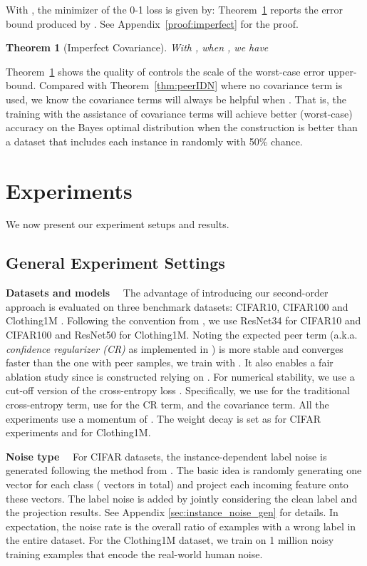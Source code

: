 \documentclass[final]{cvpr}
\newtheorem{theorem}{Theorem}
\newcommand{\rev}[1]{{\color{blue}#1}}
\newcommand{\rev}[1]{#1}
\newcommand{\covpeer}{\text{CAL}}
\begin{document}
With , the minimizer of the 0-1 \covpeer{} loss is given by: 
{\small
}
Theorem~\ref{thm:imperfect} reports the error bound produced by . See Appendix~\ref{proof:imperfect} for the proof.
\begin{theorem}[Imperfect Covariance]\label{thm:imperfect}
With , when , we have

\end{theorem}

Theorem~\ref{thm:imperfect} shows the quality of  controls the scale of the worst-case error upper-bound.
Compared with Theorem~\ref{thm:peerIDN} where no covariance term is used, we know the covariance terms will always be helpful when . That is, the training with the assistance of covariance terms will achieve better (worst-case) accuracy on the Bayes optimal distribution when the construction  is better than a dataset that includes each instance in  randomly with 50\% chance.



 \section{Experiments}
We now present our experiment setups and results. 
\subsection{General Experiment Settings}

\noindent\textbf{Datasets and models}~~
The advantage of introducing our second-order approach is evaluated on three benchmark datasets: CIFAR10, CIFAR100 \cite{krizhevsky2009learning} and Clothing1M \cite{xiao2015learning}. Following the convention from \cite{sieve2020,xu2019l_dmi}, we use ResNet34 for CIFAR10 and CIFAR100 and ResNet50 for Clothing1M.
Noting the expected peer term   (a.k.a. \textit{confidence regularizer (CR)} as implemented in \cite{sieve2020}) is more stable and converges faster than the one with peer samples, we train with .
It also enables a fair ablation study since  is constructed relying on \cite{sieve2020}.
For numerical stability, we use a cut-off version of the cross-entropy loss .
Specifically, we use  for the traditional cross-entropy term, use  for the CR term, and the covariance term.
All the experiments use a momentum of .
The weight decay is set as  for CIFAR experiments and  for Clothing1M.

\noindent\textbf{Noise type}~~
For CIFAR datasets, the instance-dependent label noise is generated following the method from \cite{sieve2020,xia2020parts}.
\rev{The basic idea is randomly generating one vector for each class ( vectors in total) and project each incoming  feature  onto  these  vectors.
The label noise is added by jointly considering the clean label and the projection  results.
See Appendix \ref{sec:instance_noise_gen} for details.}
In expectation, the noise rate  is the overall ratio of examples with a wrong label in the entire dataset.
For the Clothing1M dataset, we train on 1 million noisy training examples that encode the real-world human noise. 
\end{document}
